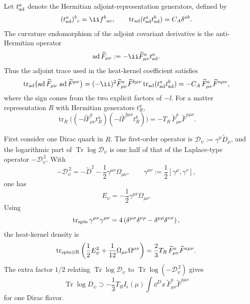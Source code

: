 Let \(t_{\rm ad}^a\) denote the Hermitian adjoint-representation generators,
defined by
\[
  (t_{\rm ad}^a)^b{}_{c}=\ii f^b{}_{ac},
  \qquad
  \operatorname{tr}_{\rm ad}(t_{\rm ad}^a t_{\rm ad}^b)
  =
  C_A\delta^{ab}.
\]
The curvature endomorphism of the adjoint covariant derivative is the
anti-Hermitian operator
\[
  \operatorname{ad}\widetilde F_{\mu\nu}
  :=
  -\ii \widetilde F^a_{\mu\nu}t_{\rm ad}^a .
\]
Thus the adjoint trace used in the heat-kernel coefficient satisfies
\begin{equation}
  \operatorname{tr}_{\rm ad}
  \bigl(
    \operatorname{ad}\widetilde F_{\mu\nu}\,
    \operatorname{ad}\widetilde F^{\mu\nu}
  \bigr)
  =
  (-\ii)^2
  \widetilde F^a_{\mu\nu}\widetilde F^{b\mu\nu}
  \operatorname{tr}_{\rm ad}(t_{\rm ad}^a t_{\rm ad}^b)
  =
  -C_A\,
  \widetilde F^a_{\mu\nu}\widetilde F^{a\mu\nu},
  \label{eq:qcd-adjoint-trace-sign}
\end{equation}
where the sign comes from the two explicit factors of \(-\ii\).  For a matter
representation \(R\) with Hermitian generators \(t_R^a\),
\[
  \operatorname{tr}_{R}
  \bigl(
    (-\ii \widetilde F^a_{\mu\nu}t_R^a)
    (-\ii \widetilde F^{b\mu\nu}t_R^b)
  \bigr)
  =
  -T_R\,
  \widetilde F^a_{\mu\nu}\widetilde F^{a\mu\nu}.
\]

First consider one Dirac quark in \(R\).  The first-order operator is
\(\mathcal D_\psi:=\gamma^\mu\widetilde D_\mu\), and the logarithmic
part of \(\operatorname{Tr}\log\mathcal D_\psi\) is one half of that
of the Laplace-type operator \(-\mathcal D_\psi^{\,2}\).  With
\[
  -\mathcal D_\psi^{\,2}
  =
  -\widetilde D^2
  -\frac12\gamma^{\mu\nu}\Omega_{\mu\nu},
  \qquad
  \gamma^{\mu\nu}:=\frac12[\gamma^\mu,\gamma^\nu],
\]
one has
\[
  E_\psi=-\frac12\gamma^{\mu\nu}\Omega_{\mu\nu}.
\]
Using
\[
  \operatorname{tr}_{\rm spin}
  \gamma^{\mu\nu}\gamma^{\rho\sigma}
  =
  4\left(
    \delta^{\mu\sigma}\delta^{\nu\rho}
    -\delta^{\mu\rho}\delta^{\nu\sigma}
  \right),
\]
the heat-kernel density is
\[
  \operatorname{tr}_{\rm spin\otimes R}
  \left(
    \frac12E_\psi^2
    +\frac1{12}\Omega_{\mu\nu}\Omega^{\mu\nu}
  \right)
  =
  \frac23 T_R\,
  \widetilde F^a_{\mu\nu}\widetilde F^{a\mu\nu}.
\]
The extra factor \(1/2\) relating
\(\operatorname{Tr}\log\mathcal D_\psi\) to
\(\operatorname{Tr}\log(-\mathcal D_\psi^{\,2})\) gives
\begin{equation}
  \operatorname{Tr}\log D_\psi
  \supset
  -\frac13 T_R I_\epsilon(\mu)
  \int\dd^Dx\,
  \widetilde F^a_{\mu\nu}\widetilde F^{a\mu\nu}
  \label{eq:qcd-quark-determinant-f2}
\end{equation}
for one Dirac flavor.

